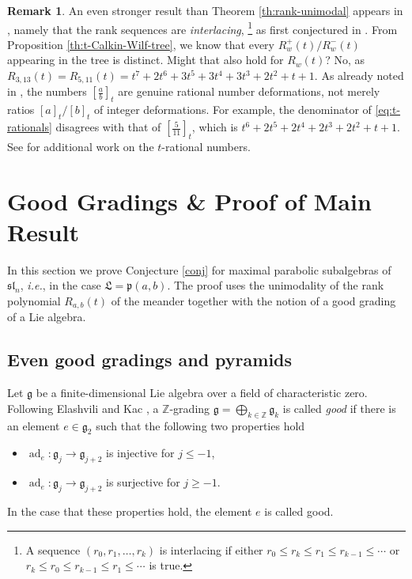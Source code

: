 \documentclass{amsart}
\newcommand{\demph}[1]{\textcolor{myblue}{\emph{#1}}}
\renewcommand{\demph}[1]{\emph{#1}}
\def\fp{\mathfrak p} %
\def\ZZ{\mathbb Z}
\def\sl{\mathfrak{sl}}
\def\L{\mathfrak L}
\newcommand{\pab}[1][a,b]{\fp(#1)}
\def\sln{\sl_n}
\newcommand{\Rfull}[1]{R_{#1}}
\newcommand{\Rtop}[1]{R_{#1}^+}
\newcommand{\Rbot}[1]{R_{#1}^-}
\def\ad{\operatorname{ad}}
\theoremstyle{definition}
\newtheorem{remark}[theorem]{Remark}
\begin{document}
\begin{remark}
An even stronger result than Theorem \ref{th:rank-unimodal} appears in \cite{kantarci2023rank}, namely that the rank sequences are \emph{interlacing},%
\footnote{A sequence $(r_0, r_1, \ldots, r_k)$ is interlacing if either $r_0 \leq r_k \leq r_1 \leq r_{k-1} \leq \cdots$ or $r_k \leq r_0 \leq r_{k-1} \leq r_{1} \leq \cdots$ is true.} as first conjectured in \cite{mcconville2021rank-unimodality}. 
From Proposition \ref{th:t-Calkin-Wilf-tree}, we know that every $\Rtop{w}(t)/\Rbot{w}(t)$ appearing in the tree is distinct. Might that also hold for $\Rfull{w}(t)$? No, as $R_{3,13}(t) = R_{5,11}(t) = t^7 +  2t^6 + 3t^5 +3t^4 + 3t^3 +2t^2+ t + 1$.
As already noted in \cite{morier2020q-deformed}, the numbers ${[\frac{a}{b}]}_t$ are genuine rational number deformations, not merely ratios $[a]_t / [b]_t$ of integer deformations. For example, the denominator of \eqref{eq:t-rationals} disagrees with that of ${[\frac{5}{11}]}_t$, which is $t^6+2t^5+2t^4+2t^3+2t^2+t+1$. 
See \cite{mcconville2026hyperbinary} for additional work on the $t$-rational numbers.
\end{remark}


\section{Good Gradings \& Proof of Main Result}
\label{sec:good gradings}

In this section we prove Conjecture \ref{conj} for maximal parabolic subalgebras of $\sln$, {\it i.e.}, in the case $\L=\pab$. The proof uses the unimodality of the rank polynomial $\Rfull{a,b}(t)$ of the meander together with the notion of a good grading of a Lie algebra.

\subsection{Even good gradings and pyramids}
Let $\mathfrak g$ be a finite-dimensional Lie algebra over a field of characteristic zero. Following Elashvili and Kac \cite{elashvili2005classification}, a $\ZZ$-grading $\mathfrak g =\bigoplus _{k\in \ZZ}\mathfrak g_k$ is called \demph{good} if there is an element $e\in \mathfrak g_2$ such that the following two properties hold
\begin{itemize}
\item $\ad_e: \mathfrak g_j\rightarrow \mathfrak g_{j+2}$ is injective for $j\leq -1$,
\item $\ad_e: \mathfrak g_j\rightarrow \mathfrak g_{j+2}$ is surjective for $j\geq -1$.
\end{itemize}
In the case that these properties hold, the element $e$ is called good.  
\end{document}
